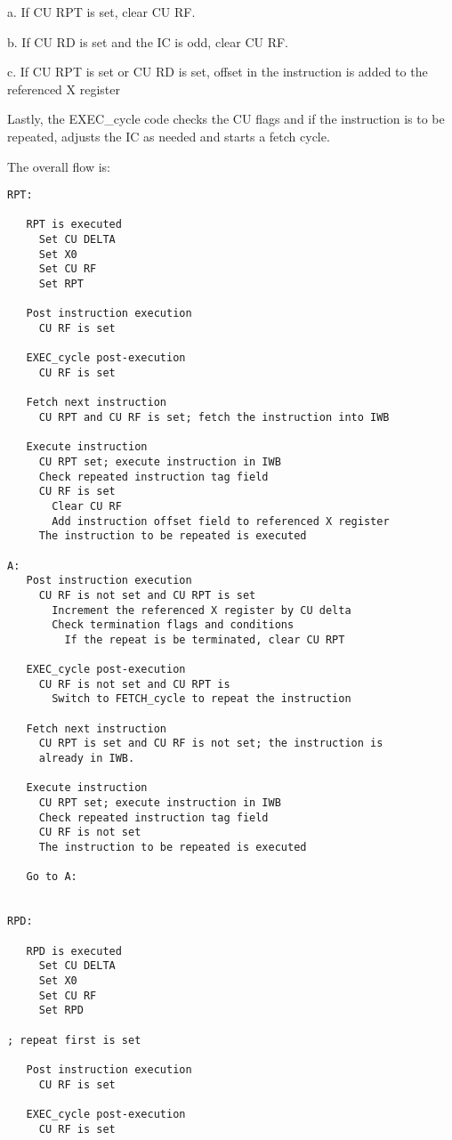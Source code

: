 \documentclass[notitlepage]{report}
\begin{document}
a. If CU RPT is set, clear CU RF.

b. If CU RD is set and the IC is odd, clear CU RF.

c. If CU RPT is set or CU RD is set, offset in the instruction is added to the referenced X register

Lastly, the EXEC\_cycle code checks the CU flags and if the instruction is to be repeated,
adjusts the IC as needed and starts a fetch cycle.

The overall flow is:

\begin{verbatim}
RPT:

   RPT is executed
     Set CU DELTA
     Set X0
     Set CU RF
     Set RPT

   Post instruction execution
     CU RF is set

   EXEC_cycle post-execution
     CU RF is set

   Fetch next instruction
     CU RPT and CU RF is set; fetch the instruction into IWB

   Execute instruction
     CU RPT set; execute instruction in IWB
     Check repeated instruction tag field
     CU RF is set
       Clear CU RF
       Add instruction offset field to referenced X register
     The instruction to be repeated is executed

A:
   Post instruction execution
     CU RF is not set and CU RPT is set
       Increment the referenced X register by CU delta
       Check termination flags and conditions
         If the repeat is be terminated, clear CU RPT

   EXEC_cycle post-execution
     CU RF is not set and CU RPT is
       Switch to FETCH_cycle to repeat the instruction

   Fetch next instruction
     CU RPT is set and CU RF is not set; the instruction is
     already in IWB.

   Execute instruction
     CU RPT set; execute instruction in IWB
     Check repeated instruction tag field
     CU RF is not set
     The instruction to be repeated is executed

   Go to A:


RPD:

   RPD is executed
     Set CU DELTA
     Set X0
     Set CU RF
     Set RPD

; repeat first is set

   Post instruction execution
     CU RF is set

   EXEC_cycle post-execution
     CU RF is set


\end{verbatim}
\end{document}
